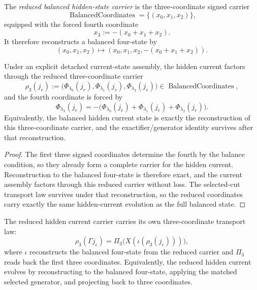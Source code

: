 \begin{definition}
\label{def:reduced-balanced-hidden-state-carrier}
The \emph{reduced balanced hidden-state carrier} is the three-coordinate signed
carrier
\[
\operatorname{BalancedCoordinates}
=
\{(x_0,x_1,x_2)\},
\]
equipped with the forced fourth coordinate
\[
x_3
:=
-(x_0+x_1+x_2).
\]
It therefore reconstructs a balanced four-state by
\[
(x_0,x_1,x_2)
\longmapsto
(x_0,x_1,x_2,-(x_0+x_1+x_2)).
\]
\end{definition}

\begin{corollary}
\label{thm:explicit-hidden-current-reduces-to-three-coordinates}
Under an explicit detached current-state assembly, the hidden current factors
through the reduced three-coordinate carrier
\[
\rho_3(j_e)
:=
\bigl(
\Phi_{\lambda_0}(j_e),
\Phi_{\lambda_1}(j_e),
\Phi_{\lambda_2}(j_e)
\bigr)\in\operatorname{BalancedCoordinates},
\]
and the fourth coordinate is forced by
\[
\Phi_{\lambda_3}(j_e)
=
-
\bigl(
\Phi_{\lambda_0}(j_e)+
\Phi_{\lambda_1}(j_e)+
\Phi_{\lambda_2}(j_e)
\bigr).
\]
Equivalently, the balanced hidden current state is exactly the reconstruction
of this three-coordinate carrier, and the exactifier/generator identity survives
after that reconstruction.
\end{corollary}

\begin{proof}
The first three signed coordinates determine the fourth by the balance
condition, so they already form a complete carrier for the hidden current.
Reconstruction to the balanced four-state is therefore exact, and the current
assembly factors through this reduced carrier without loss. The selected-cut
transport law survives under that reconstruction, so the reduced coordinates
carry exactly the same hidden-current evolution as the full balanced state.
\end{proof}

\begin{corollary}
\label{thm:reduced-hidden-current-transport-law}
The reduced hidden current carrier carries its own three-coordinate transport
law:
\[
\rho_3(\Gamma j_e)
=
\Pi_3\!\bigl(X(\iota(\rho_3(j_e)))\bigr),
\]
where \(\iota\) reconstructs the balanced four-state from the reduced carrier
and \(\Pi_3\) reads back the first three coordinates. Equivalently, the reduced
hidden current evolves by reconstructing to the balanced four-state, applying
the matched selected generator, and projecting back to three coordinates.
\end{corollary}


